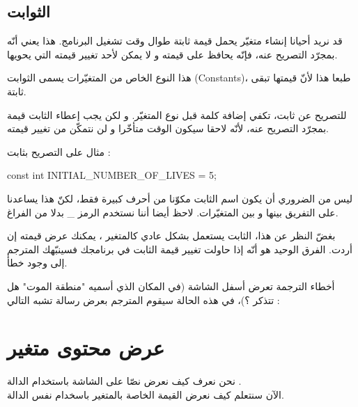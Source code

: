 \subsection{الثوابت}
قد نريد أحيانا إنشاء متغيّر يحمل قيمة ثابتة طوال وقت تشغيل البرنامج. هذا يعني أنّه بمجرّد التصريح عنه، فإنّه يحافظ على قيمته و لا يمكن لأحد تغيير قيمته التي يحويها.

هذا النوع الخاص من المتغيّرات يسمى الثوابت (\textenglish{Constants})، طبعا هذا لأنّ قيمتها تبقى ثابتة.

للتصريح عن ثابت، تكفي إضافة كلمة
قبل نوع المتغيّر. و لكن يجب إعطاء الثابت قيمة بمجرّد التصريح عنه، لأنّه لاحقا سيكون الوقت متأخّرا و لن نتمكّن من تغيير قيمته.

مثال على التصريح بثابت :
\begin{Csource}
const int INITIAL_NUMBER_OF_LIVES = 5;
\end{Csource}
\begin{information}
  ليس من الضروري أن يكون اسم الثابت مكوّنا من أحرف كبيرة فقط، لكنّ هذا يساعدنا على التفريق بينها و بين المتغيّرات. لاحظ أيضا أننا نستخدم الرمز
\_
 بدلا من الفراغ.
\end{information}
بغضّ النظر عن هذا، الثابت يستعمل بشكل عادي كالمتغير ، يمكنك عرض قيمته إن أردت. الفرق الوحيد هو أنّه إذا حاولت تغيير قيمة الثابت في برنامجك فسينبّهك المترجم إلى وجود خطأ.

أخطاء الترجمة تعرض أسفل الشاشة (في المكان الذي أسميه "منطقة الموت" هل تتذكر ؟)، في هذه الحالة سيقوم المترجم بعرض رسالة تشبه التالي :\\

\section{عرض محتوى متغير}
نحن نعرف كيف نعرض نصّا على الشاشة باستخدام الدالة
.\\
الآن سنتعلم كيف نعرض القيمة الخاصة بالمتغير باسخدام نفس الدالة.

